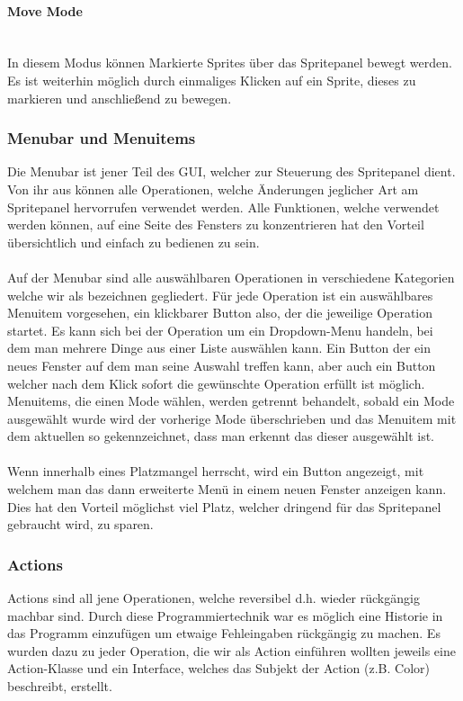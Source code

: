 \paragraph{Move Mode}\ \\
In diesem Modus können Markierte Sprites über das Spritepanel bewegt werden. Es ist weiterhin möglich durch einmaliges Klicken auf ein Sprite, dieses zu markieren und anschließend zu bewegen.

\subsubsection{Menubar und Menuitems}

Die Menubar ist jener Teil des GUI, welcher zur Steuerung des Spritepanel dient. Von ihr aus können alle Operationen, welche Änderungen jeglicher Art am Spritepanel hervorrufen verwendet werden. Alle Funktionen, welche verwendet werden können, auf eine Seite des Fensters zu konzentrieren hat den Vorteil übersichtlich und einfach zu bedienen zu sein.\\
\\
Auf der Menubar sind alle auswählbaren Operationen in verschiedene Kategorien welche wir als  bezeichnen gegliedert. Für jede Operation ist ein auswählbares Menuitem vorgesehen, ein klickbarer Button also, der die jeweilige Operation startet. Es kann sich bei der Operation um ein Dropdown-Menu handeln, bei dem man mehrere Dinge aus einer Liste auswählen kann. Ein Button der ein neues Fenster auf dem man seine Auswahl treffen kann, aber auch ein Button welcher nach dem Klick sofort die gewünschte Operation erfüllt ist möglich. Menuitems, die einen Mode wählen, werden getrennt behandelt, sobald ein Mode ausgewählt wurde wird der vorherige Mode überschrieben und das Menuitem mit dem aktuellen so gekennzeichnet, dass man erkennt das dieser ausgewählt ist.\\
\\
Wenn innerhalb eines  Platzmangel herrscht, wird ein Button angezeigt, mit welchem man das dann erweiterte Menü in einem neuen Fenster anzeigen kann. Dies hat den Vorteil möglichst viel Platz, welcher dringend für das Spritepanel gebraucht wird, zu sparen.

\subsubsection{Actions}

Actions sind all jene Operationen, welche reversibel d.h. wieder rückgängig machbar sind. Durch diese Programmiertechnik war es möglich eine Historie in das Programm einzufügen um etwaige Fehleingaben rückgängig zu machen. Es wurden dazu zu jeder Operation, die wir als Action einführen wollten jeweils eine Action-Klasse und ein Interface, welches das Subjekt der Action (z.B. Color) beschreibt, erstellt.


